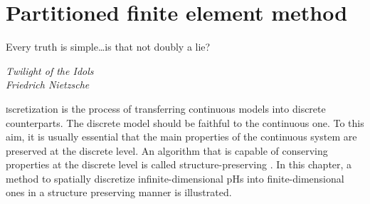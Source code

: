 \chapter{Partitioned finite element method}\label{ch:pfem}

\epigraph{Every truth is simple\dots is that not doubly a lie?}{\textit{Twilight of the Idols \\ Friedrich Nietzsche}}

\minitoc

\lettrine{\color{theme}{D}}iscretization is the process of transferring continuous models into discrete counterparts. The discrete model should be faithful to the continuous one. To this aim, it is usually essential that the main properties of the continuous system are preserved at the discrete level. An algorithm that is capable of conserving properties at the discrete level is called structure-preserving \cite{christiansen2011}. In this chapter, a method to spatially discretize infinite-dimensional pHs into finite-dimensional ones in a structure preserving manner is illustrated.

